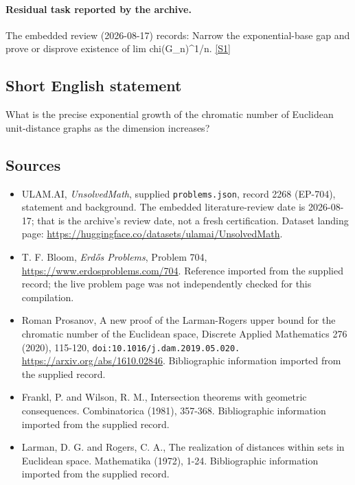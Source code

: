 \documentclass[11pt,a4paper]{article}
\newcommand{\sref}[2]{\hyperlink{source:#1:#2}{[S#2]}}
\begin{document}
\paragraph{Residual task reported by the archive.}

The embedded review (2026-08-17) records: Narrow the exponential-base gap and prove or disprove existence of lim chi(G\_n)\textasciicircum{}{1/n}. \sref{2268}{1}

\subsection{Short English statement}

What is the precise exponential growth of the chromatic number of Euclidean unit-distance graphs as the dimension increases?

\subsection{Sources}

{\small

\begin{itemize}

\item[\hypertarget{source:2268:1}{S1}] ULAM.AI, \emph{UnsolvedMath}, supplied \texttt{problems.json}, record 2268 (EP-704), statement and background. The embedded literature-review date is 2026-08-17; that is the archive’s review date, not a fresh certification. Dataset landing page: \url{https://huggingface.co/datasets/ulamai/UnsolvedMath}.

\item[\hypertarget{source:2268:2}{S2}] T. F. Bloom, \emph{Erdős Problems}, Problem 704, \url{https://www.erdosproblems.com/704}. Reference imported from the supplied record; the live problem page was not independently checked for this compilation.

\item[\hypertarget{source:2268:3}{S3}] Roman Prosanov, A new proof of the Larman-Rogers upper bound for the chromatic number of the Euclidean space, Discrete Applied Mathematics 276 (2020), 115-120, \nolinkurl{doi:10.1016/j.dam.2019.05.020.} \url{https://arxiv.org/abs/1610.02846}. Bibliographic information imported from the supplied record.

\item[\hypertarget{source:2268:4}{S4}] Frankl, P. and Wilson, R. M., Intersection theorems with geometric consequences. Combinatorica (1981), 357-368. Bibliographic information imported from the supplied record.

\item[\hypertarget{source:2268:5}{S5}] Larman, D. G. and Rogers, C. A., The realization of distances within sets in Euclidean space. Mathematika (1972), 1-24. Bibliographic information imported from the supplied record.

\end{itemize}

}

\label{end:2268}
\end{document}

